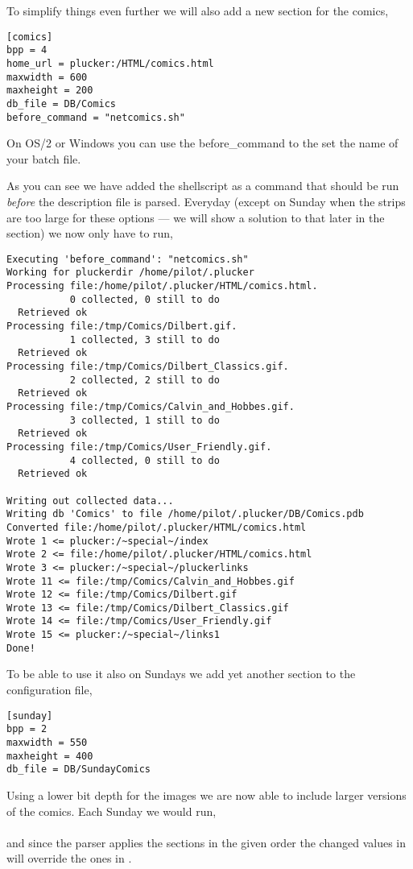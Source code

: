 To simplify things even further we will also add a new section for the
comics,

\begin{verbatim}
[comics]
bpp = 4
home_url = plucker:/HTML/comics.html
maxwidth = 600
maxheight = 200
db_file = DB/Comics
before_command = "netcomics.sh"
\end{verbatim}

\note On OS/2 or Windows you can use the before\_command to the set
the name of your batch file.

As you can see we have added the shellscript as a command that should
be run \emph{before} the description file is parsed. Everyday (except
on Sunday when the strips are too large for these options --- we will
show a solution to that later in the section) we now only have to run,\\

\begin{verbatim}
Executing 'before_command': "netcomics.sh"
Working for pluckerdir /home/pilot/.plucker
Processing file:/home/pilot/.plucker/HTML/comics.html.
           0 collected, 0 still to do
  Retrieved ok
Processing file:/tmp/Comics/Dilbert.gif.
           1 collected, 3 still to do
  Retrieved ok
Processing file:/tmp/Comics/Dilbert_Classics.gif.
           2 collected, 2 still to do
  Retrieved ok
Processing file:/tmp/Comics/Calvin_and_Hobbes.gif.
           3 collected, 1 still to do
  Retrieved ok
Processing file:/tmp/Comics/User_Friendly.gif.
           4 collected, 0 still to do
  Retrieved ok

Writing out collected data...
Writing db 'Comics' to file /home/pilot/.plucker/DB/Comics.pdb
Converted file:/home/pilot/.plucker/HTML/comics.html
Wrote 1 <= plucker:/~special~/index
Wrote 2 <= file:/home/pilot/.plucker/HTML/comics.html
Wrote 3 <= plucker:/~special~/pluckerlinks
Wrote 11 <= file:/tmp/Comics/Calvin_and_Hobbes.gif
Wrote 12 <= file:/tmp/Comics/Dilbert.gif
Wrote 13 <= file:/tmp/Comics/Dilbert_Classics.gif
Wrote 14 <= file:/tmp/Comics/User_Friendly.gif
Wrote 15 <= plucker:/~special~/links1
Done!

\end{verbatim}

To be able to use it also on Sundays we add yet another section to
the configuration file,

\begin{verbatim}
[sunday]
bpp = 2
maxwidth = 550
maxheight = 400
db_file = DB/SundayComics
\end{verbatim}

Using a lower bit depth for the images we are now able to include
larger versions of the comics.  Each Sunday we would run,\\

\\

and since the parser applies the sections in the given order the
changed values in  will override the ones in .


